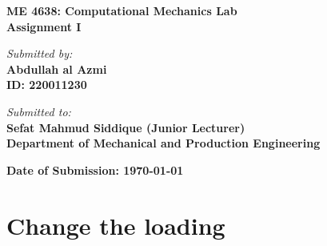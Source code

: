 \documentclass{article}
\begin{document}
\begin{titlepage}
    \begin{center}
        \vspace*{2cm}
        {\Huge \textbf{ ME 4638: Computational Mechanics Lab}} \\
        \vspace{1cm}
        \Large{\textbf{Assignment I}} \\

        \vfill

        \textit{\large Submitted by:} \\
        \vspace{0.3cm}
        \textbf{Abdullah al Azmi} \\
        \textbf{ID: 220011230} \\

        \vfill

        \textit{\large Submitted to:} \\
        \vspace{0.3cm}
        \textbf{\Large Sefat Mahmud Siddique (Junior Lecturer)} \\
        \textbf{Department of Mechanical and Production Engineering} \\

        \vfill

        \textbf{Date of Submission: \today}
        \vspace*{1cm}
    \end{center}
\end{titlepage}

\newpage

\setcounter{section}{2}

\section{Change the loading}
\end{document}
